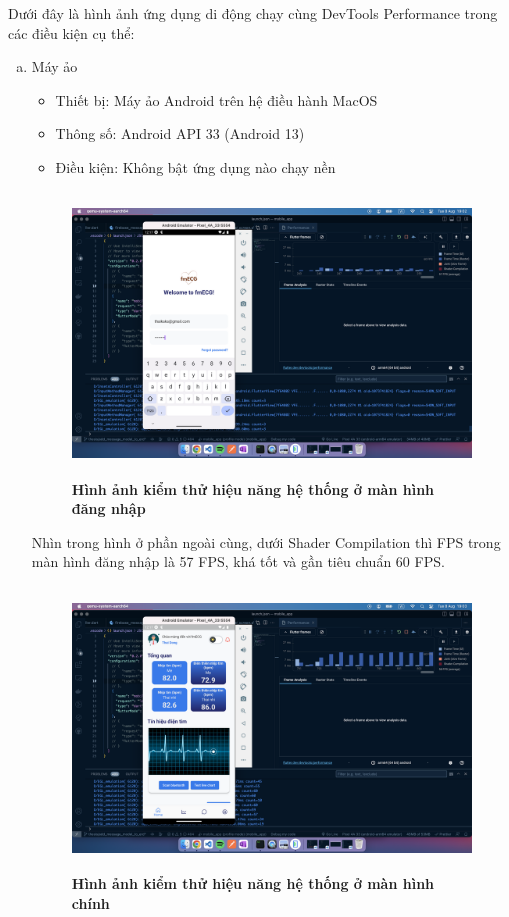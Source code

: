 Dưới đây là hình ảnh ứng dụng di động chạy cùng DevTools Performance trong các điều kiện cụ thể:
\begin{enumerate}[a)]
  \item Máy ảo
    \begin{itemize}
      \item Thiết bị: Máy ảo Android trên hệ điều hành MacOS
      \item Thông số: Android API 33 (Android 13)
      \item Điều kiện: Không bật ứng dụng nào chạy nền
    \end{itemize}

    \begin{figure}[H]
      \centering
      \includegraphics[width=12cm,height=7.5cm]{Images/mobile_app/demo/login_performance.png}
      \caption[Hình ảnh kiểm thử hiệu năng hệ thống ở màn hình đăng nhập]{\bfseries \fontsize{12pt}{0pt}
      \selectfont Hình ảnh kiểm thử hiệu năng hệ thống ở màn hình đăng nhập}
      \label{login_performance}
    \end{figure}
    Nhìn trong hình ở phần ngoài cùng, dưới Shader Compilation thì FPS trong màn hình đăng nhập là 57 FPS, khá tốt và
    gần tiêu chuẩn 60 FPS.
    
    \begin{figure}[H]
      \centering
      \includegraphics[width=12cm,height=7.5cm]{Images/mobile_app/demo/in_app_performance.png}
      \caption[Hình ảnh kiểm thử hiệu năng hệ thống ở màn hình chính]{\bfseries \fontsize{12pt}{0pt}
      \selectfont Hình ảnh kiểm thử hiệu năng hệ thống ở màn hình chính}
      \label{in_app_performance}
    \end{figure}


\end{enumerate}
